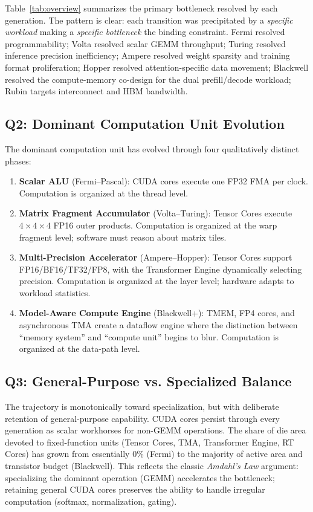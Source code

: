 \documentclass[10pt,twocolumn]{article}
\begin{document}
Table~\ref{tab:overview} summarizes the primary bottleneck resolved by each generation. The pattern is clear: each transition was precipitated by a \textit{specific workload} making a \textit{specific bottleneck} the binding constraint. Fermi resolved programmability; Volta resolved scalar GEMM throughput; Turing resolved inference precision inefficiency; Ampere resolved weight sparsity and training format proliferation; Hopper resolved attention-specific data movement; Blackwell resolved the compute-memory co-design for the dual prefill/decode workload; Rubin targets interconnect and HBM bandwidth.

\subsection{Q2: Dominant Computation Unit Evolution}

The dominant computation unit has evolved through four qualitatively distinct phases:
\begin{enumerate}
\item \textbf{Scalar ALU} (Fermi--Pascal): CUDA cores execute one FP32 FMA per clock. Computation is organized at the thread level.
\item \textbf{Matrix Fragment Accumulator} (Volta--Turing): Tensor Cores execute $4\times4\times4$ FP16 outer products. Computation is organized at the warp fragment level; software must reason about matrix tiles.
\item \textbf{Multi-Precision Accelerator} (Ampere--Hopper): Tensor Cores support FP16/BF16/TF32/FP8, with the Transformer Engine dynamically selecting precision. Computation is organized at the layer level; hardware adapts to workload statistics.
\item \textbf{Model-Aware Compute Engine} (Blackwell+): TMEM, FP4 cores, and asynchronous TMA create a dataflow engine where the distinction between ``memory system'' and ``compute unit'' begins to blur. Computation is organized at the data-path level.
\end{enumerate}

\subsection{Q3: General-Purpose vs. Specialized Balance}

The trajectory is monotonically toward specialization, but with deliberate retention of general-purpose capability. CUDA cores persist through every generation as scalar workhorses for non-GEMM operations. The share of die area devoted to fixed-function units (Tensor Cores, TMA, Transformer Engine, RT Cores) has grown from essentially 0\% (Fermi) to the majority of active area and transistor budget (Blackwell). This reflects the classic \textit{Amdahl's Law} argument: specializing the dominant operation (GEMM) accelerates the bottleneck; retaining general CUDA cores preserves the ability to handle irregular computation (softmax, normalization, gating).
\end{document}
